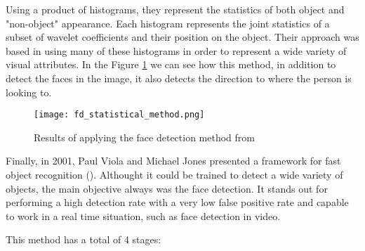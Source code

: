 	Using a product of histograms, they represent the statistics of both object and "non-object" appearance. Each histogram represents the joint statistics of a subset of wavelet coefficients and their position on the object. Their approach was based in using many of these histograms in order to represent a wide variety of visual attributes. In the Figure \ref{fig:statistical_method_face_det} we can see how this method, in addition to detect the faces in the image, it also detects the direction to where the person is looking to.

	\begin{figure}[!ht]
		\centering
		\texttt{[image: fd\_statistical\_method.png]}
		\caption{Results of applying the face detection method from \cite{schneiderman2000statistical}}
		\label{fig:statistical_method_face_det}
	\end{figure}

	Finally, in 2001, Paul Viola and Michael Jones presented a framework for fast object recognition (\cite{viola2001rapid}). Althought it could be trained to detect a wide variety of objects, the main objective always was the face detection. It stands out for performing a high detection rate with a very low false positive rate and capable to work in a real time situation, such as face detection in video.

	This method has a total of 4 stages:
	
